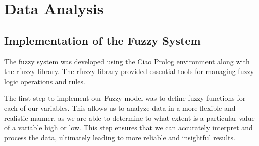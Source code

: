 \documentclass[fleqn,11pt]{article}
\begin{document}
\newpage
\section{Data Analysis}

\subsection{Implementation of the Fuzzy System}

The fuzzy system was developed using the Ciao Prolog environment along with the rfuzzy library. The rfuzzy library provided essential tools for managing fuzzy logic operations and rules.

The first step to implement our Fuzzy model was to define fuzzy functions for each of our variables. This allows us to analyze data in a more flexible and realistic manner, as we are able to determine to what extent is a particular value of a variable high or low. This step ensures that we can accurately interpret and process the data, ultimately leading to more reliable and insightful results.
\end{document}
